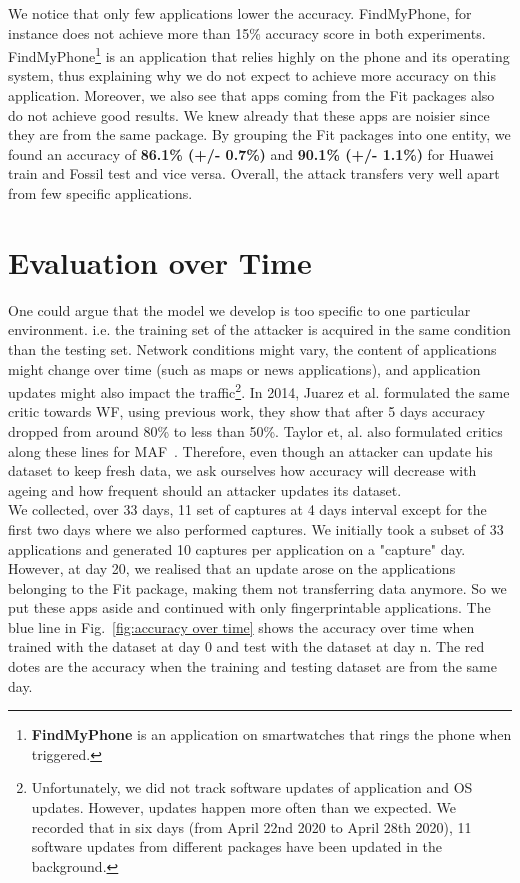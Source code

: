\newpage
We notice that only few applications lower the accuracy. FindMyPhone, for instance does not achieve more than 15\% accuracy score in both experiments. FindMyPhone\footnote{\textbf{FindMyPhone} is an application on smartwatches that rings the phone when triggered.} is an application that relies highly on the phone and its operating system, thus explaining why we do not expect to achieve more accuracy on this application. Moreover, we also see that apps coming from the Fit packages also do not achieve good results. We knew already that these apps are noisier since they are from the same package. By grouping the Fit packages into one entity, we found an accuracy of \textbf{86.1\% (+/- 0.7\%)} and \textbf{90.1\% (+/- 1.1\%)} for Huawei train and Fossil test and vice versa. Overall, the attack transfers very well apart from few specific applications.

\section{Evaluation over Time}
\label{sec:eval over time}
One could argue that the model we develop is too specific to one particular environment. i.e. the training set of the attacker is acquired in the same condition than the testing set. Network conditions might vary, the content of applications might change over time (such as maps or news applications), and application updates might also impact the traffic\footnote{Unfortunately, we did not track software updates of application and OS updates. However, updates happen more often than we expected. We recorded that in six days (from April 22nd 2020 to April 28th 2020), 11 software updates from different packages have been updated in the background.}. In 2014, Juarez et al. formulated the same critic towards WF, using previous work, they show that after 5 days accuracy dropped from around 80\% to less than 50\%\cite{juarez2014critical}. Taylor et, al. also formulated critics along these lines for MAF~\cite{taylor2017robust}. Therefore, even though an attacker can update his dataset to keep fresh data, we ask ourselves how accuracy will decrease with ageing and how frequent should an attacker updates its dataset.
\\

We collected, over 33 days, 11 set of captures at 4 days interval except for the first two days where we also performed captures. We initially took a subset of 33 applications and generated 10 captures per application on a "capture" day. However, at day 20, we realised that an update arose on the applications belonging to the Fit package, making them not transferring data anymore. So we put these apps aside and continued with only fingerprintable applications. The blue line in Fig.~\ref{fig:accuracy over time} shows the accuracy over time when trained with the dataset at day 0 and test with the dataset at day n. The red dotes are the accuracy when the training and testing dataset are from the same day. 

